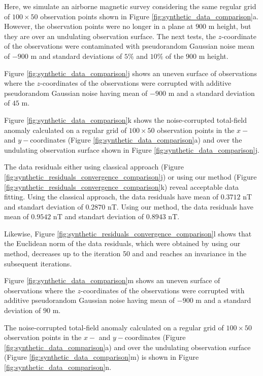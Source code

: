 Here, we simulate an airborne magnetic survey considering the same regular grid of $100 \times 50$ observation points shown in Figure  \ref{fig:synthetic_data_comparison}a.
However, the observation points were no longer in a plane at $900$ m height, 
but they are over an undulating observation surface.
The next tests, the $z$-coordinate of the observations were contaminated with 
pseudorandom Gaussian noise mean of $- 900$ m and standard deviations of $5\%$ and $10\%$ of the $900$ m height.


Figure \ref{fig:synthetic_data_comparison}j shows an uneven surface of observations where  the $z$-coordinates of the observations were corrupted with additive  pseudorandom Gaussian noise having mean of  $- 900$ m  and a standard deviation of $45$ m.
 
Figure \ref{fig:synthetic_data_comparison}k shows the noise-corrupted total-field anomaly calculated 
on a regular grid  of $100 \times 50$ observation points in the $x-$ and $y-$coordinates 
(Figure  \ref{fig:synthetic_data_comparison}a) and
over the undulating observation surface shown in Figure \ref{fig:synthetic_data_comparison}j.
 
The data residuals either using classical approach 
(Figure \ref{fig:synthetic_residuals_convergence_comparison}j) or
using our method (Figure \ref{fig:synthetic_residuals_convergence_comparison}k) reveal acceptable data fitting.
Using the classical approach, the data residuals have mean of $0.3712$ nT 
and standart deviation of $0.2870$ nT.
Using our method, the data residuals have mean of $0.9542$ nT and standart deviation of $0.8943$ nT. 

Likewise,  Figure \ref{fig:synthetic_residuals_convergence_comparison}l shows that the Euclidean norm of the data residuals, which were obtained by using our method, decreases up to the iteration 50 and 
and reaches an invariance in the subsequent iterations.  



Figure \ref{fig:synthetic_data_comparison}m shows an uneven surface of observations where  the $z$-coordinates of the observations were corrupted with additive pseudorandom Gaussian noise having mean of  $- 900$ m  and a standard deviation of $90$ m.

The noise-corrupted total-field anomaly calculated on a regular grid  of $100 \times 50$ observation points in the $x-$ and $y-$coordinates (Figure  \ref{fig:synthetic_data_comparison}a) and
over the undulating observation surface (Figure \ref{fig:synthetic_data_comparison}m)
is shown in Figure \ref{fig:synthetic_data_comparison}n.

